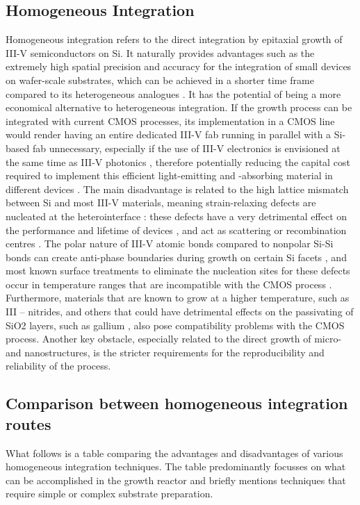 \subsection{Homogeneous Integration}
Homogeneous integration refers to the direct integration by epitaxial growth of III-V semiconductors on Si. 
It naturally provides advantages such as the extremely high spatial precision and accuracy for the integration of small devices on wafer-scale substrates, which can be achieved in a shorter time frame compared to its heterogeneous analogues \cite{Wang2017}. It has the potential of being a more economical alternative to heterogeneous integration. If the growth process can be integrated with current CMOS processes, its implementation in a CMOS line would render having an entire dedicated III-V fab running in parallel with a Si-based fab unnecessary, especially if the use of III-V electronics is envisioned at the same time as III-V photonics \cite{Wang2017}, therefore potentially reducing the capital cost required to implement this efficient light-emitting and -absorbing material in different devices \cite{Tang2019}.
The main disadvantage is related to the high lattice mismatch between Si and most III-V materials, meaning strain-relaxing defects are nucleated at the heterointerface \cite{Kunert2018}: these defects have a very detrimental effect on the performance and lifetime of devices \cite{Mahajan2000, Zenari2021}, and act as scattering or recombination centres \cite{Jeon2015}. The polar nature of III-V atomic bonds compared to nonpolar Si-Si bonds can create anti-phase boundaries during growth on certain Si facets \cite{Kunert2018}, and most known surface treatments to eliminate the nucleation sites for these defects occur in temperature ranges that are incompatible with the CMOS process \cite{Miller2000}. Furthermore, materials that are known to grow at a higher temperature, such as III – nitrides, and others that could have detrimental effects on the passivating of SiO2 layers, such as gallium \cite{Miller2000}, also pose compatibility problems with the CMOS process. Another key obstacle, especially related to the direct growth of micro- and nanostructures, is the stricter requirements for the reproducibility and reliability of the process.
\subsection{Comparison between homogeneous integration routes}
What follows is a table comparing the advantages and disadvantages of various homogeneous integration techniques. The table predominantly focusses on what can be accomplished in the growth reactor and briefly mentions techniques that require simple or complex substrate preparation.


